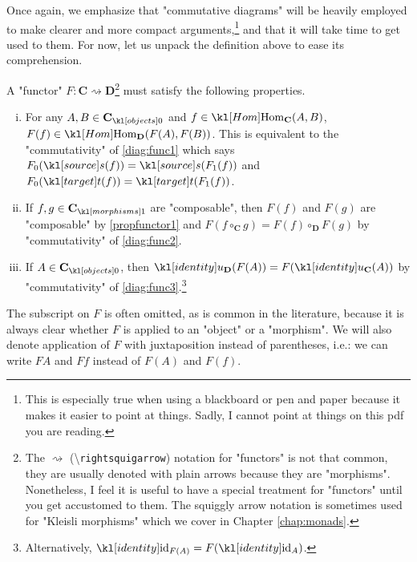 \documentclass[main.tex]{subfiles}
\begin{document}
\begin{rem}\label{rem:funcconditions}
	Once again, we emphasize that "commutative diagrams" will be heavily employed to make clearer and more compact arguments,\footnote{This is especially true when using a blackboard or pen and paper because it makes it easier to point at things. Sadly, I cannot point at things on this pdf you are reading.} and that it will take time to get used to them. For now, let us unpack the definition above to ease its comprehension.
	
	A "functor" $F:\mathbf{C}\rightsquigarrow \mathbf{D}$\footnote{The $\rightsquigarrow$ (\textbackslash\texttt{rightsquigarrow}) notation for "functors" is not that common, they are usually denoted with plain arrows because they are "morphisms". Nonetheless, I feel it is useful to have a special treatment for "functors" until you get accustomed to them. The squiggly arrow notation is sometimes used for "Kleisli morphisms" which we cover in Chapter \ref{chap:monads}.} must satisfy the following properties.
	\begin{enumerate}[i.]
		\item\label{propfunctor1} For any $A, B \in \obj{\mathbf{C}}$ and $f \in \Hom_{\mathbf{C}}(A,B)$, $F(f) \in \Hom_{\mathbf{D}}(F(A), F(B))$. This is equivalent to the "commutativity" of \eqref{diag:func1} which says $F_0(\source(f)) = \source(F_1(f))$ and $F_0(\target(f)) = \target(F_1(f))$.
		\item If $f,g \in \mor{\mathbf{C}}$ are "composable", then $F(f)$ and $F(g)$ are "composable" by \ref{propfunctor1} and $F(f\circ_{\mathbf{C}} g) = F(f) \circ_{\mathbf{D}} F(g)$ by "commutativity" of \eqref{diag:func2}.
		\item If $A \in \obj{\mathbf{C}}$, then $\idu_{\mathbf{D}}(F(A)) = F(\idu_{\mathbf{C}}(A))$ by "commutativity" of \eqref{diag:func3}.\footnote{Alternatively, $\id_{F(A)} = F(\id_A)$.}
	\end{enumerate}
	The subscript on $F$ is often omitted, as is common in the literature, because it is always clear whether $F$ is applied to an "object" or a "morphism". We will also denote application of $F$ with juxtaposition instead of parentheses, i.e.: we can write $FA$ and $Ff$ instead of $F(A)$ and $F(f)$.
\end{rem}
\end{document}
